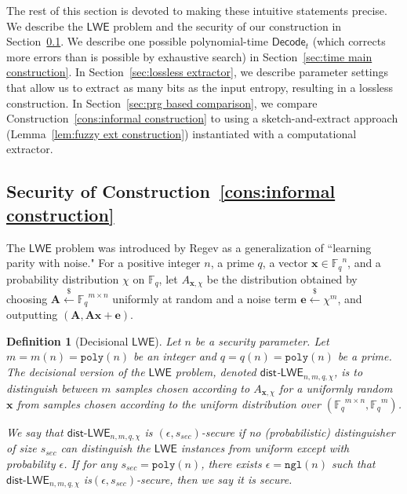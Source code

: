 \documentclass[11pt]{article}
\newcommand{\secref}[1]{\mbox{Section~\ref{#1}}}
\newcommand{\lemref}[1]{\mbox{Lemma~\ref{#1}}}
\newcommand{\consref}[1]{\mbox{Construction~\ref{#1}}}
\newcommand{\class}[1]{{\ensuremath{\mathsf{#1}}}}
\newcommand{\vect}[1]{\ensuremath{\textbf{#1}}}
\newcommand{\Fq}{\ensuremath{\mathbb{F}_q}}
\newcommand{\decode}{\ensuremath{\mathsf{Decode}}}
\newcommand{\poly}{\ensuremath{\mathtt{poly}}\xspace}
\newcommand{\ngl}{\ensuremath{\mathtt{ngl}}\xspace}
\newcommand{\lwe}{\class{LWE}}
\newcommand{\LWE}{\class{LWE}}
\newcommand{\distLWE}{\ensuremath{\class{dist\mbox{-}LWE}}}
\newtheorem{definition}[theorem]{Definition}
\newcommand{\ve}{\vect{e}}
\newcommand{\vA}{\vect{A}}
\newcommand{\vx}{\vect{x}}
\begin{document}
The rest of this section is devoted to making these intuitive statements precise.
 We describe the \class{LWE} problem and the security of our construction in \secref{subsec:LWE}.
We describe one possible polynomial-time $\decode_t$ (which corrects more errors than is possible by exhaustive search) in \secref{sec:time main construction}.  In \secref{sec:lossless extractor}, we describe parameter settings that allow us to extract as many bits as the input entropy, resulting in a lossless construction.  In \secref{sec:prg based comparison}, we compare \consref{cons:informal construction} to using a sketch-and-extract approach (\lemref{lem:fuzzy ext construction}) instantiated with a computational extractor. 



\subsection{Security of \consref{cons:informal construction}}
\label{subsec:LWE}
The $\LWE$ problem was introduced by Regev \cite{regev2005LWE, regevLWEsurvey} as a generalization of ``learning parity with noise." For a positive integer $n$,  a prime $q$, a vector $\vx \in \Fq^n$, and a probability distribution $\chi$ on $\Fq$, let $A_{\vect{x}, \chi}$ be the distribution obtained by choosing $\vA \overset{\$}\leftarrow \Fq^{m\times n}$ uniformly at random and a noise term $\ve \overset{\$}\leftarrow \chi^m$, and outputting $(\vA, \vA\vx+\ve)$. 

\begin{definition}[Decisional $\lwe$]\label{def:dist-LWE}Let $n$ be a security parameter.  
Let $m = m(n) = \poly(n)$ be an integer and $q = q(n) = \poly(n)$ be a prime. The decisional version of the $\LWE$ problem, denoted \class{dist}-$\LWE_{n, m, q, \chi}$, is to distinguish between $m$ samples chosen according to $A_{\vx, \chi}$ for a uniformly random $\vx$ from samples chosen according to the uniform distribution over $(\Fq^{m\times n}, \Fq^m)$. 

We say that $\distLWE_{n, m, q, \chi}$ is $(\epsilon, s_{sec})$-secure if no (probabilistic) distinguisher of size $s_{sec}$ can distinguish the $\lwe$ instances from uniform except with probability $\epsilon$.  If for any $s_{sec} = \poly(n)$, there exists   $\epsilon  = \ngl(n)$ such that  $\distLWE_{n, m, q, \chi}$ is$(\epsilon, s_{sec})$-secure, then we say  it is \emph{secure}.
\end{definition}
\end{document}
